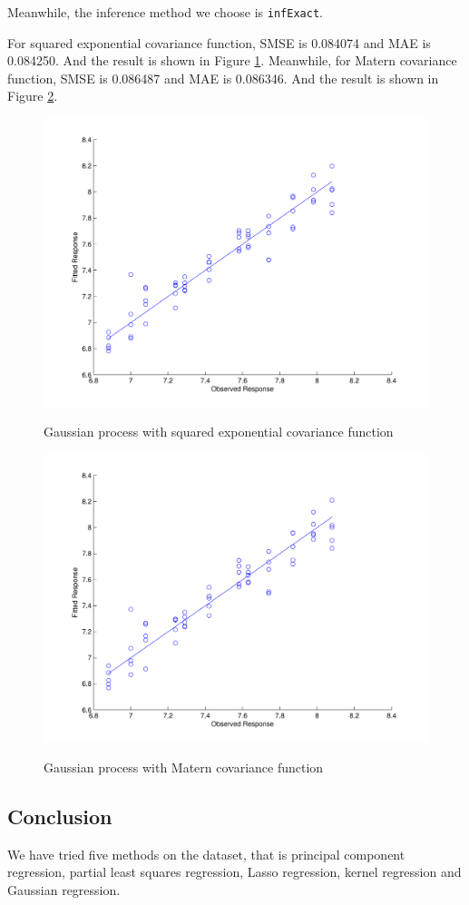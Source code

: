 \documentclass[a4paper]{article}
\begin{document}
Meanwhile, the inference method we choose is \texttt{infExact}.

For squared exponential covariance function, SMSE is 0.084074 and MAE is 0.084250. And the result is shown in Figure \ref{pic_gp1}. Meanwhile, for Matern covariance function, SMSE is 0.086487 and MAE is 0.086346. And the result is shown in Figure \ref{pic_gp2}.
\begin{figure}[h]
  \centering
  \includegraphics[width=.6\textwidth]{images/predict_gp1.pdf}\\
  \caption{Gaussian process with squared exponential covariance function}\label{pic_gp1}
\end{figure}
\begin{figure}[h]
  \centering
  \includegraphics[width=.6\textwidth]{images/predict_gp2.pdf}\\
  \caption{Gaussian process with Matern covariance function}\label{pic_gp2}
\end{figure}

\subsection{Conclusion}
We have tried five methods on the dataset, that is principal component regression, partial least squares regression, Lasso regression, kernel regression and Gaussian regression.
\end{document}
